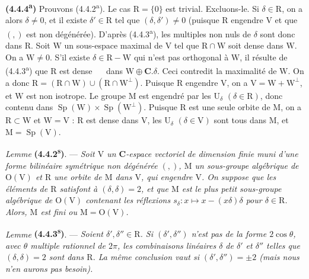 \documentclass[11pt,leqno]{article}
\newcommand{\Page}[1]{\ifvmode\noindent\else\unskip\ \fi{\footnotesize\textcolor{gray}{[p.\,#1]}}\ \ignorespaces}
\begin{document}
\textbf{(4.4.4\textsuperscript{a})} Prouvons (4.4.2\textsuperscript{a}). Le cas \(\mathrm{R}=\{0\}\) est trivial. Excluons-le. Si \(\delta\in\mathrm{R}\), on a alors \(\delta\neq0\), et il existe \(\delta'\in\mathrm{R}\) tel que \((\delta,\delta')\neq0\) (puisque \(\mathrm{R}\) engendre \(\mathrm{V}\) et que \((,)\) est non dégénérée). D’après (4.4.3\textsuperscript{a}), les multiples non nuls de \(\delta\) sont donc dans \(\mathrm{R}\). Soit \(\mathrm{W}\) un sous-espace maximal de \(\mathrm{V}\) tel que \(\mathrm{R}\cap\mathrm{W}\) soit dense dans \(\mathrm{W}\). On a \(\mathrm{W}\neq0\). S’il existe \(\delta\in\mathrm{R}-\mathrm{W}\) qui n’est pas orthogonal à \(\mathrm{W}\), il résulte de (4.4.3\textsuperscript{a}) que \(\mathrm{R}\) est dense
\Page{228}
dans \(\mathrm{W}\oplus\mathbf{C}.\delta\). Ceci contredit la maximalité de \(\mathrm{W}\). On a donc \(\mathrm{R}=(\mathrm{R}\cap\mathrm{W})\cup(\mathrm{R}\cap\mathrm{W}^{\perp})\). Puisque \(\mathrm{R}\) engendre \(\mathrm{V}\), on a \(\mathrm{V}=\mathrm{W}+\mathrm{W}^{\perp}\), et \(\mathrm{W}\) est non isotrope. Le groupe \(\mathrm{M}\) est engendré par les \(\mathrm{U}_\delta\) \((\delta\in\mathrm{R})\), donc contenu dans \(\operatorname{Sp}(\mathrm{W})\times\operatorname{Sp}(\mathrm{W}^{\perp})\). Puisque \(\mathrm{R}\) est une seule orbite de \(\mathrm{M}\), on a \(\mathrm{R}\subset\mathrm{W}\) et \(\mathrm{W}=\mathrm{V}\) : \(\mathrm{R}\) est dense dans \(\mathrm{V}\), les \(\mathrm{U}_\delta\) \((\delta\in\mathrm{V})\) sont tous dans \(\mathrm{M}\), et \(\mathrm{M}=\operatorname{Sp}(\mathrm{V})\).

\textit{Lemme} \textbf{(4.4.2\textsuperscript{s})}. — \textit{Soit \(\mathrm{V}\) un \(\mathbf{C}\)-espace vectoriel de dimension finie muni d’une forme bilinéaire symétrique non dégénérée \((,)\), \(\mathrm{M}\) un sous-groupe algébrique de \(\mathrm{O}(\mathrm{V})\) et \(\mathrm{R}\) une orbite de \(\mathrm{M}\) dans \(\mathrm{V}\), qui engendre \(\mathrm{V}\). On suppose que les éléments de \(\mathrm{R}\) satisfont à \((\delta,\delta)=2\), et que \(\mathrm{M}\) est le plus petit sous-groupe algébrique de \(\mathrm{O}(\mathrm{V})\) contenant les réflexions \(s_\delta:x\mapsto x-(x\delta)\delta\) pour \(\delta\in\mathrm{R}\). Alors, \(\mathrm{M}\) est fini ou \(\mathrm{M}=\mathrm{O}(\mathrm{V})\).}

\textit{Lemme} \textbf{(4.4.3\textsuperscript{s})}. — \textit{Soient \(\delta',\delta''\in\mathrm{R}\). Si \((\delta',\delta'')\) n’est pas de la forme \(2\cos\theta\), avec \(\theta\) multiple rationnel de \(2\pi\), les combinaisons linéaires \(\delta\) de \(\delta'\) et \(\delta''\) telles que \((\delta,\delta)=2\) sont dans \(\mathrm{R}\). La même conclusion vaut si \((\delta',\delta'')=\pm2\) (mais nous n’en aurons pas besoin).}
\end{document}
